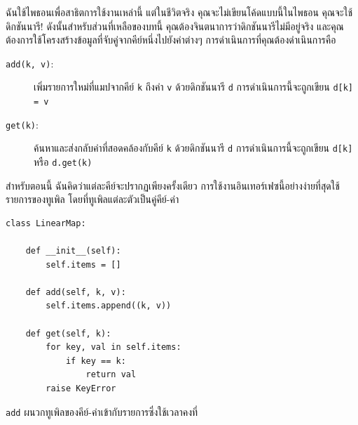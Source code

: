 ฉันใช้ไพธอนเพื่อสาธิตการใช้งานเหล่านี้ แต่ในชีวิตจริง คุณจะไม่เขียนโค้ดแบบนี้ในไพธอน คุณจะใช้ดิกชันนารี! 
ดังนั้นสำหรับส่วนที่เหลือของบทนี้ คุณต้องจินตนาการว่าดิกชันนารีไม่มีอยู่จริง 
และคุณต้องการใช้โครงสร้างข้อมูลที่จับคู่จากคีย์หนึ่งไปยังค่าต่างๆ การดำเนินการที่คุณต้องดำเนินการคือ

\begin{description}


\item[{\tt add(k, v)}:] เพิ่มรายการใหม่ที่แมปจากคีย์ {\tt k} ถึงค่า {\tt v} ด้วยดิกชันนารี {\tt d} การดำเนินการนี้จะถูกเขียน {\tt d[k] = v}


\item[{\tt get(k)}:] ค้นหาและส่งกลับค่าที่สอดคล้องกับคีย์ {\tt k} ด้วยดิกชันนารี {\tt d} การดำเนินการนี้จะถูกเขียน {\tt d[k]} หรือ {\tt d.get(k)}

\end{description}


สำหรับตอนนี้ ฉันคิดว่าแต่ละคีย์จะปรากฏเพียงครั้งเดียว การใช้งานอินเทอร์เฟซนี้อย่างง่ายที่สุดใช้รายการของทูเพิล โดยที่ทูเพิลแต่ละตัวเป็นคู่คีย์-ค่า


\begin{verbatim}
class LinearMap:

    def __init__(self):
        self.items = []

    def add(self, k, v):
        self.items.append((k, v))

    def get(self, k):
        for key, val in self.items:
            if key == k:
                return val
        raise KeyError
\end{verbatim}

{\tt add} ผนวกทูเพิลของคีย์-ค่าเข้ากับรายการซึ่งใช้เวลาคงที่

